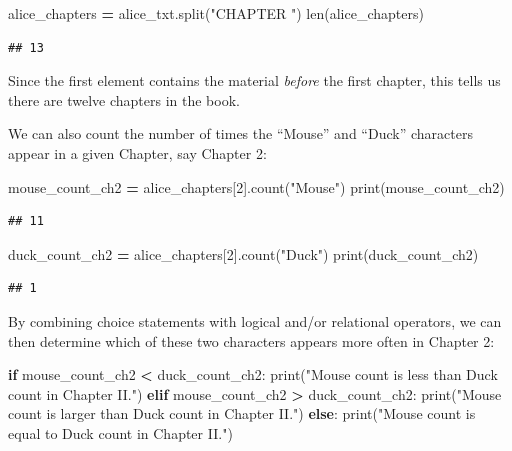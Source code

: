 \documentclass[
]{book}
\newenvironment{Shaded}{\begin{snugshade}}{\end{snugshade}}
\newcommand{\BuiltInTok}[1]{#1}
\newcommand{\ControlFlowTok}[1]{\textcolor[rgb]{0.13,0.29,0.53}{\textbf{#1}}}
\newcommand{\DecValTok}[1]{\textcolor[rgb]{0.00,0.00,0.81}{#1}}
\newcommand{\NormalTok}[1]{#1}
\newcommand{\OperatorTok}[1]{\textcolor[rgb]{0.81,0.36,0.00}{\textbf{#1}}}
\newcommand{\StringTok}[1]{\textcolor[rgb]{0.31,0.60,0.02}{#1}}
\begin{document}
\begin{Shaded}
\begin{Highlighting}[]
\NormalTok{alice\_chapters }\OperatorTok{=}\NormalTok{ alice\_txt.split(}\StringTok{"CHAPTER "}\NormalTok{)}
\BuiltInTok{len}\NormalTok{(alice\_chapters)}
\end{Highlighting}
\end{Shaded}

\begin{verbatim}
## 13
\end{verbatim}

Since the first element contains the material \emph{before} the first chapter, this tells us there are twelve chapters in the book.

We can also count the number of times the ``Mouse'' and ``Duck'' characters appear in a given Chapter, say Chapter 2:

\begin{Shaded}
\begin{Highlighting}[]
\NormalTok{mouse\_count\_ch2 }\OperatorTok{=}\NormalTok{ alice\_chapters[}\DecValTok{2}\NormalTok{].count(}\StringTok{"Mouse"}\NormalTok{)}
\BuiltInTok{print}\NormalTok{(mouse\_count\_ch2)}
\end{Highlighting}
\end{Shaded}

\begin{verbatim}
## 11
\end{verbatim}

\begin{Shaded}
\begin{Highlighting}[]
\NormalTok{duck\_count\_ch2 }\OperatorTok{=}\NormalTok{ alice\_chapters[}\DecValTok{2}\NormalTok{].count(}\StringTok{"Duck"}\NormalTok{)}
\BuiltInTok{print}\NormalTok{(duck\_count\_ch2)}
\end{Highlighting}
\end{Shaded}

\begin{verbatim}
## 1
\end{verbatim}

By combining choice statements with logical and/or relational operators, we can then determine which of these two characters
appears more often in Chapter 2:

\begin{Shaded}
\begin{Highlighting}[]
\ControlFlowTok{if}\NormalTok{ mouse\_count\_ch2 }\OperatorTok{\textless{}}\NormalTok{ duck\_count\_ch2:}
    \BuiltInTok{print}\NormalTok{(}\StringTok{"Mouse count is less than Duck count in Chapter II."}\NormalTok{)}
\ControlFlowTok{elif}\NormalTok{ mouse\_count\_ch2 }\OperatorTok{\textgreater{}}\NormalTok{ duck\_count\_ch2:}
    \BuiltInTok{print}\NormalTok{(}\StringTok{"Mouse count is larger than Duck count in Chapter II."}\NormalTok{)}
\ControlFlowTok{else}\NormalTok{:}
    \BuiltInTok{print}\NormalTok{(}\StringTok{"Mouse count is equal to Duck count in Chapter II."}\NormalTok{)}
\end{Highlighting}
\end{Shaded}
\end{document}
